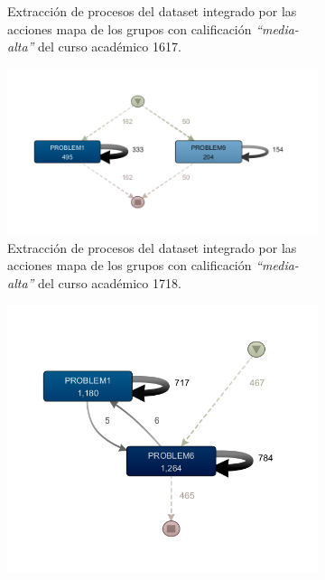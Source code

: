 \begin{figure}[H]
\begin{subfigure}[t]{0.60\textwidth}
    \caption{Extracción de procesos del dataset integrado por las acciones mapa de los grupos con calificación \emph{``media-alta''} del curso académico 1617.}
    \label{fig:mapYear1617MidHighGrades}
  \end{subfigure}
  \hfill
  \begin{subfigure}[t]{0.60\textwidth}
    \includegraphics[width=1.10\textwidth, height=0.80\textwidth]{imagenes/DISCO_map/Dataset FusionadoYear1718MidHighGrades.png}
    \caption{Extracción de procesos del dataset integrado por las acciones mapa de los grupos con calificación \emph{``media-alta''} del curso académico 1718.}
    \label{fig:mapYear1718MidHighGrades}
  \end{subfigure}
  \hfill
  \begin{subfigure}[t]{0.60\textwidth}
    \includegraphics[width=1.10\textwidth, height=1.10\textwidth]{imagenes/DISCO_map/Dataset FusionadoYear1920MidHighGrades.png}

\end{subfigure}
\end{figure}
